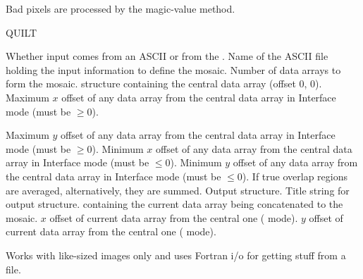 {\begin{manroutinedescription}
  Bad pixels are processed by the magic-value method.

  QUILT

\begin{manparametertable}
  Whether input comes from an ASCII {} or from the
  {}.
  Name of the ASCII file holding the input information to define 
  the mosaic.
  Number of data arrays to form the mosaic.
  {} structure containing the central data array (offset 0, 0).
  Maximum {$x$} offset of any data array from the central data array
  in {\mantt Interface} mode (must be {$\geq$}0).
\end{manparametertable}
\begin{manparametertable}
  Maximum {$y$} offset of any data array from the central data array
  in {\mantt Interface} mode (must be {$\geq$}0).
  Minimum {$x$} offset of any data array from the central data array
  in {\mantt Interface} mode (must be {$\leq$}0).
  Minimum {$y$} offset of any data array from the central data array
  in {\mantt Interface} mode (must be {$\leq$}0).
  If true overlap regions are averaged, alternatively, they are
  summed.
  Output {} structure.
  Title string for output {} structure.
 \mbox{{}}
  {} containing the current data array being concatenated to
  the mosaic.
  {$x$} offset of current data array from the central one
  ({} mode).
  {$y$} offset of current data array from the central one
  ({} mode).
\end{manparametertable}
  Works with like-sized images only and uses Fortran i/o for getting
  stuff from a file. 


\end{manroutinedescription}}
